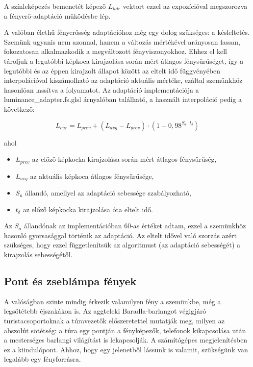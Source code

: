 A színleképezés bemenetét képező \(L_{hdr}\) vektort ezzel az expozícióval megszorozva a fényerő-adaptáció működésbe lép.

A valóban élethű fényerősség adaptációhoz még egy dolog szükséges: a késleltetés. Szemünk ugyanis nem azonnal, hanem a változás mértékével arányosan lassan, fokozatosan alkalmazkodik a megváltozott fényviszonyokhoz. Ehhez el kell tároljuk a legutóbbi képkoca kirajzolása során mért átlagos fénysűrűséget, így a legutóbbi és az éppen kirajzolt állapot között az eltelt idő függvényében interpolációval kiszámolható az adaptáció aktuális mértéke, ezáltal szemünkhöz hasonlóan lassítva a folyamatot. Az adaptáció implementációja a luminance\_adapter.fs.glsl árnyalóban található, a használt interpoláció pedig a következő:

\[
L_{cur} = L_{prev} + (L_{avg} - L_{prev}) \cdot (1 - 0,98^{S_a \cdot t_{\delta}})
\]

ahol

\begin{itemize}[noitemsep]
\item \(L_{prev}\) az előző képkocka kirajzolása során mért átlagos fénysűrűség,
\item \(L_{avg}\) az aktuális képkoca átlagos fénysűrűsége,
\item \(S_a\) állandó, amellyel az adaptáció sebessége szabályozható,
\item \(t_{\delta}\) az előző képkocka kirajzolása óta eltelt idő.
\end{itemize}

Az \(S_a\) állandónak az implementációban 60-as értéket adtam, ezzel a szemünkhöz hasonló gyorsasággal történik az adaptáció. Az eltelt idővel való szorzás azért szükséges, hogy ezzel függetlenítsük az algoritmust (az adaptáció sebességét) a kirajzolás sebességétől.

\subsection{Pont és zseblámpa fények}

A valóságban szinte mindig érkezik valamilyen fény a szemünkbe, még a legsötétebb éjszakákon is. Az aggteleki Baradla-barlangot végigjáró turistacsoportoknak a túravezetők előszeretettel mutatják meg, milyen az abszolút sötétség: a túra egy pontján a fényképezők, telefonok kikapcsolása után a mesterséges barlangi világítást is lekapcsolják. A számítógépes megjelenítésben ez a kiindulópont. Ahhoz, hogy egy jelenetből lássunk is valamit, szükségünk van legalább egy fényforrásra.

